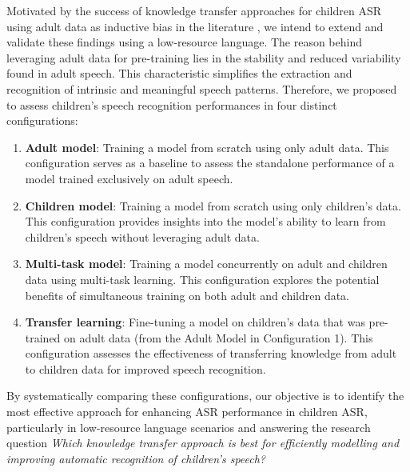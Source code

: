 Motivated by the success of knowledge transfer approaches for children ASR using adult data as inductive bias in the literature \cite{TFchildren,TransferLF,2019multi}, we intend to extend and validate these findings using a low-resource language. The reason behind leveraging adult data for pre-training lies in the stability and reduced variability found in adult speech. This characteristic simplifies the extraction and recognition of intrinsic and meaningful speech patterns.
Therefore, we proposed to assess children's speech recognition performances in four distinct configurations:
\begin{enumerate}
    \item \textbf{Adult model}: Training a model from scratch using only adult data. This configuration serves as a baseline to assess the standalone performance of a model trained exclusively on adult speech.
    \item \textbf{Children model}: Training a model from scratch using only children's data. This configuration provides insights into the model's ability to learn from children's speech without leveraging adult data.
    \item \textbf{Multi-task model}: Training a model concurrently on adult and children data using multi-task learning. This configuration explores the potential benefits of simultaneous training on both adult and children data.
    \item \textbf{Transfer learning}: Fine-tuning a model on children's data that was pre-trained on adult data (from the Adult Model in Configuration 1). This configuration assesses the effectiveness of transferring knowledge from adult to children data for improved speech recognition.
\end{enumerate}

By systematically comparing these configurations, our objective is to identify the most effective approach for enhancing ASR performance in children ASR, particularly in low-resource language scenarios and answering the research question  \textit{Which knowledge transfer approach is best for efficiently modelling and improving automatic recognition of children's speech?} 


